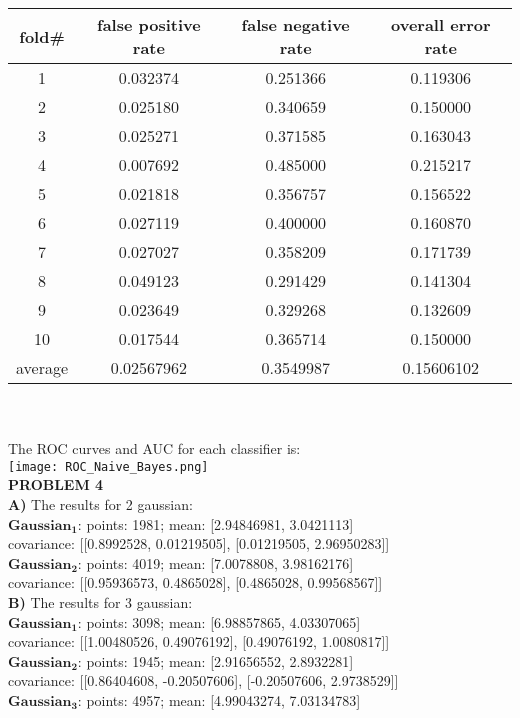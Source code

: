 \documentclass[11pt,a4paper,fleqn]{article}
\begin{document}
\begin{tabular}{|c|c|c|c|}
\hline
fold\#&false positive rate&false negative rate&overall error rate\\
\hline
1&0.032374&0.251366&0.119306\\
\hline
2&0.025180&0.340659&0.150000\\
\hline
3&0.025271&0.371585&0.163043\\
\hline
4&0.007692&0.485000&0.215217\\
\hline
5&0.021818&0.356757&0.156522\\
\hline
6&0.027119&0.400000&0.160870\\
\hline
7&0.027027&0.358209&0.171739\\
\hline
8&0.049123&0.291429&0.141304\\
\hline
9&0.023649&0.329268&0.132609\\
\hline
10&0.017544&0.365714&0.150000\\
\hline
average&0.02567962&0.3549987&0.15606102\\
\hline
\end{tabular}\\
\\
The ROC curves and AUC for each classifier is:\\
\texttt{[image: ROC\_Naive\_Bayes.png]}\\

\newpage \noindent 
\textbf{PROBLEM 4}\\
\textbf{A)} The results for 2 gaussian:\\
\indent $\mathbf{Gaussian_1}$: points: 1981; mean: [2.94846981, 3.0421113]\\
\indent covariance: [[0.8992528, 0.01219505], [0.01219505, 2.96950283]] \\
\indent $\mathbf{Gaussian_2}$: points: 4019; mean: [7.0078808, 3.98162176]\\
\indent covariance: [[0.95936573, 0.4865028], [0.4865028, 0.99568567]] \\
\textbf{B)} The results for 3 gaussian:\\
\indent $\mathbf{Gaussian_1}$: points: 3098; mean: [6.98857865, 4.03307065]\\
\indent covariance: [[1.00480526, 0.49076192], [0.49076192, 1.0080817]] \\
\indent $\mathbf{Gaussian_2}$: points: 1945; mean: [2.91656552, 2.8932281]\\
\indent covariance: [[0.86404608, -0.20507606], [-0.20507606, 2.9738529]] \\
\indent $\mathbf{Gaussian_3}$: points: 4957; mean: [4.99043274, 7.03134783]\\
\end{document}
